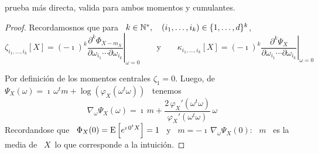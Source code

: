 prueba m\'as directa, valida para ambos momentos y cumulantes.
%
\begin{proof}
  Recordamosnos que para \ $k \in \mathbb{N}^*, \quad (i_1 , \ldots , i_k) \in \{ 1 ,
  \ldots , d \}^k$,
  \[
  \zeta_{i_1,\ldots,i_k}[X]     =     (-    \imath)^k     \left.\frac{\partial^k
      \Phi_{X-m_X}}{\partial          \omega_{i_1}          \cdots          \partial
      \omega_{i_k}}\right|_{\omega=0}       \qquad       \mbox{y}       \qquad
  \kappa_{i_1,\ldots,i_k}[X]     =    (-     \imath)^k    \left.\frac{\partial^k
      \Psi_X}{\partial          \omega_{i_1}          \cdots          \partial
      \omega_{i_k}}\right|_{\omega=0}
  \]
  
  Por  definici\'on  de  los  momentos  centrales  $\zeta_1  =  0$.   Luego,  de
  $\Psi_X(\omega)  =  \imath \,  \omega^t  m  +  \log\left( \varphi_X(  \omega^t
    \omega) \right)$ \ tenemos
  \[
  \nabla_\omega \Psi_X(\omega) =  \imath \, m + \frac{2  \, \varphi_X'( \omega^t
    \omega)}{\varphi_X'( \omega^t \omega)} \, \omega
  \]
  Recordandose que \ $\Phi_X(0) = \operatorname{E}\left[  e^{\imath \, 0^t X} \right] = 1$ \
  y \ $m =  - \imath \, \nabla_\omega \Psi_X(0)$: \ $m$ \ es  la media de \ $X$\
  lo que corresponde a la intuici\'on.


\end{proof}
